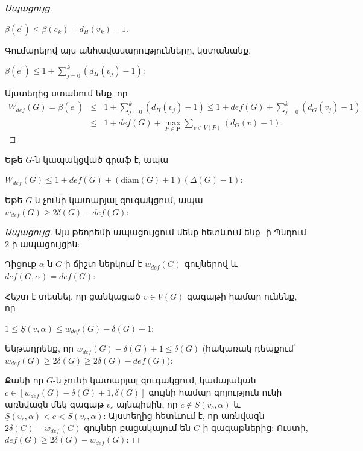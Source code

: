 \begin{hide}
\begin{proof}[Ապացույց]
\begin{center}
$\beta(e^{\prime})\leq \beta(e_{k})+d_{H}(v_{k})-1$.

\end{center}

Գումարելով այս անհավասարությունները, կստանանք.

\begin{center}
$\beta(e^{\prime})\leq 
1+{\sum\limits_{j=0}^{k}\left(d_{H}(v_{j})-1\right)}$:
\end{center}

Այստեղից ստանում ենք, որ
\begin{eqnarray*}
W_{def}(G)=\beta(e^{\prime}) &\leq&
1+{\sum\limits_{j=0}^{k}\left(d_{H}(v_{j})-1\right)}\leq
1+def(G)+{\sum\limits_{j=0}^{k}\left(d_{G}(v_{j})-1\right)}\\
&\leq& 1+def(G)+{\max\limits_{P\in \mathbf{P}}}{\sum\limits_{v\in
V(P)}}\left(d_{G}(v)-1\right):
\end{eqnarray*}
\end{proof}

\begin{corollary}
\label{c3_Wdef_diam} Եթե $G$-ն կապակցված գրաֆ է, ապա
\begin{center}
$W_{def}(G)\leq
1+def(G)+(\mathrm{diam}(G)+1)\left(\Delta(G)-1\right)$:
\end{center}
\end{corollary}
\end{hide}

\begin{theorem}
\label{t3_wdef_nopm} Եթե $G$-ն չունի կատարյալ զուգակցում, ապա
$w_{def}(G)\geq 2\delta(G)-def(G)$:
\end{theorem}
\begin{proof}[Ապացույց] Այս թեորեմի ապացույցում մենք հետևում ենք \cite{BouchardHertzDesaulniers}-ի Պնդում 2-ի ապացույցին:

Դիցուք $\alpha$-ն $G$-ի ճիշտ ներկում է $w_{def}(G)$ գույներով և 
$def(G,\alpha)=def(G)$:

Հեշտ է տեսնել, որ ցանկացած $v\in V(G)$ գագաթի համար ունենք, որ

\begin{center}
$1\leq \underline S\left(v,\alpha \right)\leq
w_{def}(G)-\delta(G)+1$:
\end{center}

Ենթադրենք, որ $w_{def}(G)-\delta(G)+1\leq \delta(G)$ (հակառակ դեպքում՝
$w_{def}(G)\geq 2\delta(G)\geq 2\delta(G)-def(G)$):

Քանի որ $G$-ն չունի կատարյալ զուգակցում, կամայական $c\in
\left[w_{def}(G)-\delta(G)+1,\delta(G)\right]$ գույնի համար գոյություն ունի առնվազն մեկ գագաթ $v_{c}$ այնպիսին, որ $c\notin S\left(v_{c},\alpha\right)$
և $\underline S\left(v_{c},\alpha \right)<c<\overline
S\left(v_{c},\alpha \right)$: Այստեղից հետևում է, որ առնվազն
$2\delta(G)-w_{def}(G)$ գույներ բացակայում են $G$-ի գագաթներից: Ուստի,
$def(G)\geq 2\delta(G)-w_{def}(G)$:
\end{proof}

